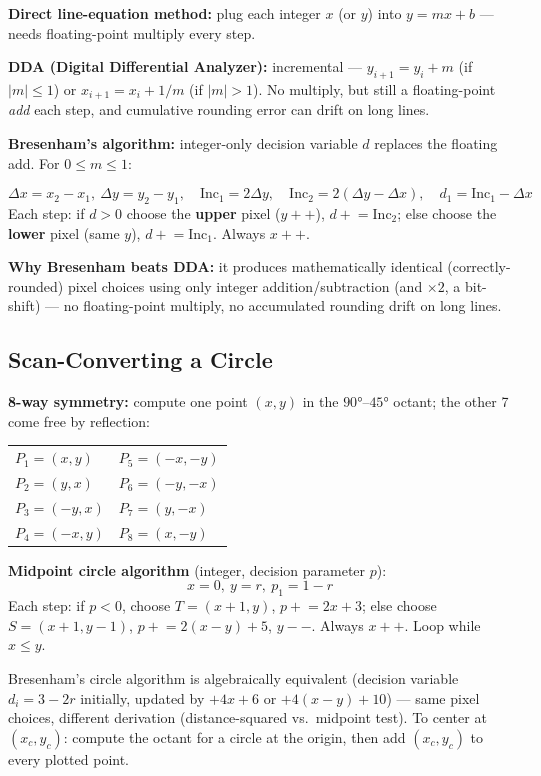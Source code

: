 \documentclass[12pt, a4paper]{article}
\newenvironment{answerbox}{\begin{mdframed}[style=answerframe]}{\end{mdframed}}
\begin{document}
\begin{keypoints}
  \item \textbf{Direct line-equation method:} plug each integer $x$ (or $y$) into $y=mx+b$ --- needs floating-point multiply every step.
  \item \textbf{DDA (Digital Differential Analyzer):} incremental --- $y_{i+1}=y_i+m$ (if $|m|\le1$) or $x_{i+1}=x_i+1/m$ (if $|m|>1$). No multiply, but still a floating-point \emph{add} each step, and cumulative rounding error can drift on long lines.
  \item \textbf{Bresenham's algorithm:} integer-only decision variable $d$ replaces the floating add. For $0\le m\le1$:
\end{keypoints}
\begin{answerbox}
$$\Delta x = x_2-x_1,\ \Delta y = y_2-y_1,\quad \mathrm{Inc}_1=2\Delta y,\quad \mathrm{Inc}_2=2(\Delta y-\Delta x),\quad d_1 = \mathrm{Inc}_1-\Delta x$$
Each step: if $d>0$ choose the \textbf{upper} pixel ($y{+}{+}$), $d \mathrel{+}= \mathrm{Inc}_2$; else choose the \textbf{lower} pixel (same $y$), $d \mathrel{+}= \mathrm{Inc}_1$. Always $x\mathrel{+}{+}$.
\end{answerbox}
\textbf{Why Bresenham beats DDA:} it produces mathematically identical (correctly-rounded) pixel choices using only integer addition/subtraction (and $\times2$, a bit-shift) --- no floating-point multiply, no accumulated rounding drift on long lines.

\subsection{Scan-Converting a Circle}
\begin{keypoints}
  \item \textbf{8-way symmetry:} compute one point $(x,y)$ in the $90°$--$45°$ octant; the other 7 come free by reflection:
\end{keypoints}
\begin{center}
\begin{tabular}{ll}
$P_1=(x,y)$ & $P_5=(-x,-y)$ \\
$P_2=(y,x)$ & $P_6=(-y,-x)$ \\
$P_3=(-y,x)$ & $P_7=(y,-x)$ \\
$P_4=(-x,y)$ & $P_8=(x,-y)$ \\
\end{tabular}
\end{center}
\begin{answerbox}
\textbf{Midpoint circle algorithm} (integer, decision parameter $p$):
$$x=0,\ y=r,\ p_1 = 1-r$$
Each step: if $p<0$, choose $T=(x{+}1,y)$, $p \mathrel{+}= 2x+3$; else choose $S=(x{+}1,y{-}1)$, $p \mathrel{+}= 2(x-y)+5$, $y{-}{-}$. Always $x{+}{+}$. Loop while $x\le y$.
\end{answerbox}
Bresenham's circle algorithm is algebraically equivalent (decision variable $d_i=3-2r$ initially, updated by $+4x+6$ or $+4(x{-}y)+10$) --- same pixel choices, different derivation (distance-squared vs.\ midpoint test). To center at $(x_c,y_c)$: compute the octant for a circle at the origin, then add $(x_c,y_c)$ to every plotted point.
\end{document}
